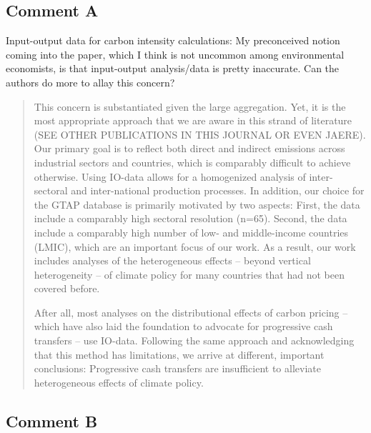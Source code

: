 \documentclass[11pt]{article}
\newenvironment{response}
{\begin{quote}\color{black}}
{\end{quote}}
\begin{document}
\subsection*{Comment A}\label{comment_R1_A}

\begin{commentbox}
    Input-output data for carbon intensity calculations: My preconceived notion coming into the paper, which I think is not uncommon among environmental economists, is that input-output analysis/data is pretty inaccurate. Can the authors do more to allay this concern?
\end{commentbox}

\begin{response}
    This concern is substantiated given the large aggregation. Yet, it is the most appropriate approach that we are aware in this strand of literature (SEE OTHER PUBLICATIONS IN THIS JOURNAL OR EVEN JAERE). Our primary goal is to reflect both direct and indirect emissions across industrial sectors and countries, which is comparably difficult to achieve otherwise. Using IO-data allows for a homogenized analysis of inter-sectoral and inter-national production processes. In addition, our choice for the GTAP database is primarily motivated by two aspects: First, the data include a comparably high sectoral resolution (n=65). Second, the data include a comparably high number of low- and middle-income countries (LMIC), which are an important focus of our work. As a result, our work includes analyses of the heterogeneous effects -- beyond vertical heterogeneity -- of climate policy for many countries that had not been covered before.

    After all, most analyses on the distributional effects of carbon pricing -- which have also laid the foundation to advocate for progressive cash transfers -- use IO-data. Following the same approach and acknowledging that this method has limitations, we arrive at different, important conclusions: Progressive cash transfers are insufficient to alleviate heterogeneous effects of climate policy.
\end{response}

\subsection*{Comment B}\label{comment_R1_B}
\end{document}
